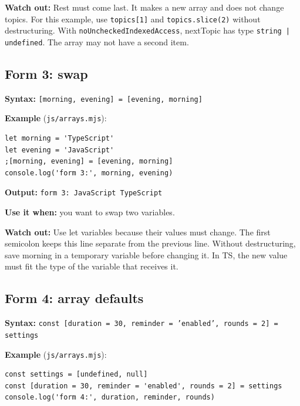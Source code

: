 \documentclass[
  10pt,
  a4paper,
]{article}
\begin{document}
\textbf{Watch out:} Rest must come last. It makes a new array and does
not change topics. For this example, use \texttt{topics[1]} and
\texttt{topics.\allowbreak{}slice(2)} without destructuring. With
\texttt{noUncheckedIndexedAccess}, nextTopic has type
\texttt{string | undefined}. The array may not have a second item.

\subsection{Form 3: swap}\label{form-3-swap}

\textbf{Syntax:} \texttt{[morning, evening] = [evening, morning]}

\textbf{Example} (\texttt{js/\allowbreak{}arrays.\allowbreak{}mjs}):

\begin{minipage}{\linewidth}

\begin{lstlisting}
let morning = 'TypeScript'
let evening = 'JavaScript'
;[morning, evening] = [evening, morning]
console.log('form 3:', morning, evening)
\end{lstlisting}

\end{minipage}\par

\textbf{Output:} \texttt{form 3:\allowbreak{} JavaScript TypeScript}

\textbf{Use it when:} you want to swap two variables.

\textbf{Watch out:} Use let variables because their values must change.
The first semicolon keeps this line separate from the previous line.
Without destructuring, save morning in a temporary variable before
changing it. In TS, the new value must fit the type of the variable that
receives it.

\subsection{Form 4: array defaults}\label{form-4-array-defaults}

\textbf{Syntax:}
\texttt{const [duration = 30, reminder = 'enabled', rounds = 2] = settings}

\textbf{Example} (\texttt{js/\allowbreak{}arrays.\allowbreak{}mjs}):

\begin{minipage}{\linewidth}

\begin{lstlisting}
const settings = [undefined, null]
const [duration = 30, reminder = 'enabled', rounds = 2] = settings
console.log('form 4:', duration, reminder, rounds)
\end{lstlisting}

\end{minipage}\par
\end{document}
